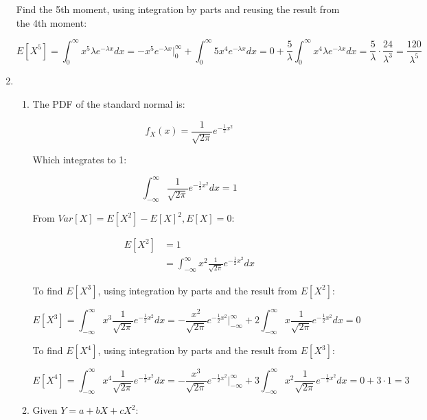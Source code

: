 \documentclass[11pt,letterpaper,titlepage]{article}
\begin{document}
\begin{enumerate}
    Find the 5th moment, using integration by parts and reusing the result from the 4th moment:
    
    $$ E[X^5] = \int_{0}^{\infty} x^5 \lambda e^{-\lambda x} dx  = -x^5 e^{-\lambda x}\Big|_{0}^{\infty} + \int_{0}^{\infty} 5 x^4 e^{-\lambda x} dx  =   0 + \frac{5}{\lambda} \int_{0}^{\infty} x^4 \lambda e^{-\lambda x} dx = \frac{5}{\lambda} \cdot \frac{24}{\lambda^3} = \frac{120}{\lambda^5} $$
    
    \item \begin{enumerate}
        \item The PDF of the standard normal is:
        
        $$ f_{X} (x) = \frac{1}{\sqrt{2\pi}} e^{-\frac{1}{2} x^2} $$
        
        Which integrates to 1:
        
        $$ \int_{-\infty}^{\infty} \frac{1}{\sqrt{2\pi}} e^{-\frac{1}{2} x^2} dx = 1 $$
        
        From $ Var[X] = E[X^2] - E[X]^2, E[X] = 0 $:
        
        \begin{equation*}
            \begin{aligned}
            E[X^2] &= 1 \\
            &= \int_{-\infty}^{\infty} x^2 \frac{1}{\sqrt{2\pi}} e^{-\frac{1}{2} x^2} dx
            \end{aligned}
        \end{equation*}
        
        To find $ E[X^3] $, using integration by parts and the result from $ E[X^2] $:
        
        $$ E[X^3] = \int_{-\infty}^{\infty} x^3 \frac{1}{\sqrt{2\pi}} e^{-\frac{1}{2} x^2} dx = -\frac{x^2}{\sqrt{2\pi}} e^{-\frac{1}{2} x^2} \Big|_{-\infty}^{\infty} + 2 \int_{-\infty}^{\infty} x \frac{1}{\sqrt{2\pi}} e^{-\frac{1}{2} x^2} dx = 0 $$
        
        To find $ E[X^4] $, using integration by parts and the result from $ E[X^3] $:
        
        $$ E[X^4] = \int_{-\infty}^{\infty} x^4 \frac{1}{\sqrt{2\pi}} e^{-\frac{1}{2} x^2} dx = -\frac{x^3}{\sqrt{2\pi}} e^{-\frac{1}{2} x^2} \Big|_{-\infty}^{\infty} + 3 \int_{-\infty}^{\infty} x^2 \frac{1}{\sqrt{2\pi}} e^{-\frac{1}{2} x^2} dx = 0 + 3 \cdot 1 = 3 $$
        
        \item Given $Y = a + b X + c X^2 $:
        

\end{enumerate}
\end{enumerate}
\end{document}
